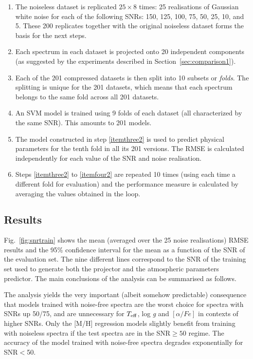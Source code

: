 \documentclass[a4paper,fleqn,usenatbib]{mnras}
\begin{document}
{{{\begin{enumerate}
\item The noiseless dataset is replicated $25\times 8$ times: 25
  realisations of Gaussian white noise for each of the following SNRs:
  150, 125, 100, 75, 50, 25, 10, and 5. These 200 replicates together
  with the original noiseless dataset forms the basis for the next
  steps.
\item Each spectrum in each dataset is projected onto 20 independent
  components (as suggested by the experiments described in
  Section~\ref{sec:comparison1}).
\item Each of the 201 compressed datasets is then split into 10
  subsets or \textit{folds}. The splitting is unique for the 201
  datasets, which means that each spectrum belongs to the same fold
  across all 201 datasets.
\item \label{itemthree2} An SVM model is trained using 9 folds of each
  dataset (all characterized by the same SNR). This amounts to 201
  models.
\item \label{itemfour2} The model constructed in step \ref{itemthree2}
  is used to predict physical parameters for the tenth fold in all its
  201 versions. The RMSE is calculated independently for each value of
  the SNR and noise realisation.
\item \label{itemfive2} Steps \ref{itemthree2} to \ref{itemfour2} are
  repeated 10 times (using each time a different fold for evaluation)
  and the performance measure is calculated by averaging the values
  obtained in the loop.
\end{enumerate}

\subsection{Results}

Fig.~\ref{fig:snrtrain} shows the mean (averaged over the 25 noise
realisations) RMSE results and the 95\% confidence interval for the
mean as a function of the SNR of the evaluation set. The nine
different lines correspond to the SNR of the training set used to
generate both the projector and the atmospheric parameters predictor.
The main conclusions of the analysis can be summarised as follows.

The analysis yields the very important (albeit somehow predictable) 
consequence that models
trained with noise-free spectra are the worst choice for spectra 
with SNRs up 50/75, and are unnecessary for $T_{\rm eff}$, 
log \textit{g} and $\left[ \alpha/Fe \right]$ in contexts of higher 
SNRs. Only the [M/H] regression models slightly benefit from training 
with noiseless spectra if the test spectra are in the SNR$\ge 50$ regime. 
The accuracy of the model trained with noise-free spectra degrades 
exponentially for SNR$<$50.

}}}
\end{document}
